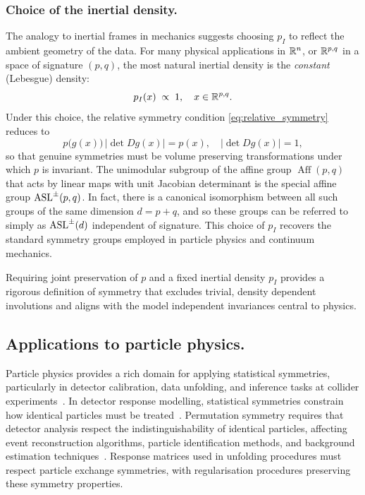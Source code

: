 \subsubsection{Choice of the inertial density.}

The analogy to inertial frames in mechanics suggests choosing $p_I$ to reflect the ambient geometry of the data.  For many physical applications in $\mathbb{R}^n$, or \(\mathbb{R}^{p, q}\) in a space of signature $(p,q)$, the most natural inertial density is the \emph{constant} (Lebesgue) density:
\begin{equation}
    p_I(x) \;\propto\; 1,
    \quad
    x\in\mathbb{R}^{p, q}.
\end{equation}
Under this choice, the relative symmetry condition \cref{eq:relative_symmetry} reduces to 
\[
    \label{eq:equiareal-maps}
    p\bigl(g(x)\bigr)\,\bigl|\det Dg(x)\bigr|
    = p(x),
    \quad
    \bigl|\det Dg(x)\bigr| = 1,
\]
so that genuine symmetries must be volume preserving transformations under which $p$ is invariant.
%
The unimodular subgroup of the affine group $\operatorname{Aff}(p, q)$ that acts by linear maps with unit Jacobian determinant is the special affine group \(\operatorname{ASL}^{\pm}(p, q)\).
%
In fact, there is a canonical isomorphism between all such groups of the same dimension \(d = p+q\), and so these groups can be referred to simply as \(\operatorname{ASL}^{\pm}(d)\) independent of signature.
%
This choice of $p_I$ recovers the standard symmetry groups employed in particle physics and continuum mechanics.

Requiring joint preservation of $p$ and a fixed inertial density $p_I$ provides a rigorous definition of symmetry that excludes trivial, density dependent involutions and aligns with the model independent invariances central to physics.    
    \subsection{Applications to particle physics.}
        Particle physics provides a rich domain for applying statistical symmetries, particularly in detector calibration, data unfolding, and inference tasks at collider experiments~\cite{Wilson:2020zey}.
        In detector response modelling, statistical symmetries constrain how identical particles must be treated~\cite{Council1Elementary-ParticleMatter}.
        Permutation symmetry requires that detector analysis respect the indistinguishability of identical particles, affecting event reconstruction algorithms, particle identification methods, and background estimation techniques~\cite{calvo-barles_machine_2025}.
        Response matrices used in unfolding procedures must respect particle exchange symmetries, with regularisation procedures preserving these symmetry properties.


